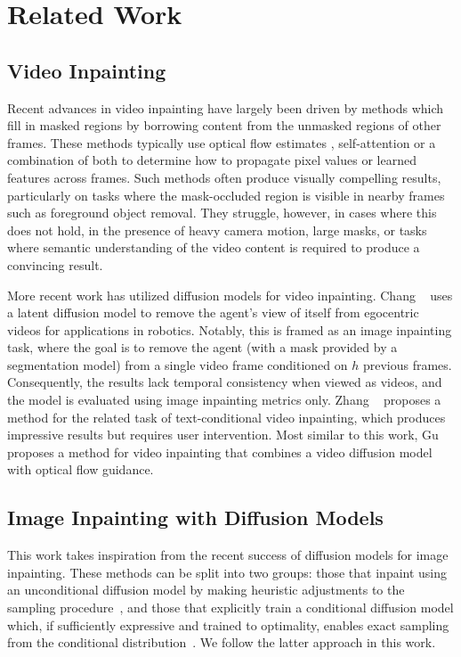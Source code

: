 
\chapter{Related Work}
\section{Video Inpainting} 
Recent advances in video inpainting have largely been driven by methods which fill in masked regions by borrowing content from the unmasked regions of other frames. These methods typically use optical flow estimates \cite{temporally, deepvideoinpainting, dfvi, flowedgeguided}, self-attention \cite{learningjoint, fuseformer, onionpeel, copypaste} or a combination of both \cite{propainter, fgt, endtoend} to determine how to propagate pixel values or learned features across frames. Such methods often produce visually compelling results, particularly on tasks where the mask-occluded region is visible in nearby frames such as foreground object removal. They struggle, however, in cases where this does not hold, \eg in the presence of heavy camera motion, large masks, or tasks where semantic understanding of the video content is required to produce a convincing result.

More recent work has utilized diffusion models for video inpainting.  Chang \etal~\cite{lookmanohands} uses a latent diffusion model \cite{stablediffusion, vahdat2021score} to remove the agent's view of itself from egocentric videos for applications in robotics. Notably, this is framed as an image inpainting task, where the goal is to remove the agent (with a mask provided by a segmentation model) from a single video frame conditioned on $h$ previous frames. Consequently, the results lack temporal consistency when viewed as videos, and the model is evaluated using image inpainting metrics only. Zhang \etal~\cite{avid} proposes a method for the related task of text-conditional video inpainting, which produces impressive results but requires user intervention. Most similar to this work, Gu \etal~\cite{fgdvi} proposes a method for video inpainting that combines a video diffusion model with optical flow guidance. 


\section{Image Inpainting with Diffusion Models}
This work takes inspiration from the recent success of diffusion models for image inpainting. These methods can be split into two groups: those that inpaint using an unconditional diffusion model by making heuristic adjustments to the sampling procedure~\cite{repaint, copaint}, and those that explicitly train a conditional diffusion model which, if sufficiently expressive and trained to optimality, enables exact sampling from the conditional distribution~\cite{palette,zhang2023adding}. We follow the latter approach in this work.









